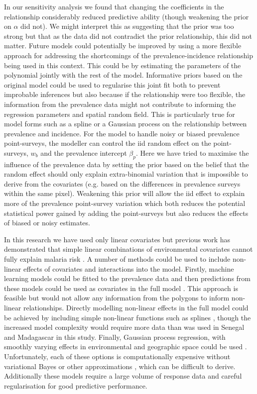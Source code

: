 \documentclass{statsoc}
\begin{document}
In our sensitivity analysis we found that changing the coefficients in the relationship considerably reduced predictive ability (though weakening the prior on $\alpha$ did not). 
We might interpret this as suggesting that the prior was too strong but that as the data did not contradict the prior relationship, this did not matter.
Future models could potentially be improved by using a more flexible approach for addressing the shortcomings of the prevalence-incidence relationship \citep{cameron2015defining} being used in this context.
This could be by estimating the parameters of the polynomial jointly with the rest of the model.
Informative priors based on the original model could be used to regularise this joint fit both to prevent improbable inferences but also because if the relationship were too flexible, the information from the prevalence data might not contribute to informing the regression parameters and spatial random field.
This is particularly true for model forms such as a spline or a Gaussian process on the relationship between prevalence and incidence.
For the model to handle noisy or biased prevalence point-surveys, the modeller can control the iid random effect on the point-surveys, $w_b$ and the prevalence intercept $\beta_p$. 
Here we have tried to maximise the influence of the prevalence data by setting the prior based on the belief that the random effect should only explain extra-binomial variation that is impossible to derive from the covariates (e.g. based on the differences in prevalence surveys within the same pixel).
Weakening this prior will allow the iid effect to explain more of the prevalence point-survey variation which both reduces the potential statistical power gained by adding the point-surveys but also reduces the effects of biased or noisy estimates.

In this research we have used only linear covariates but previous work has demonstrated that simple linear combinations of environmental covariates cannot fully explain malaria risk \citep{bhatt2017improved}.
A number of methods could be used to include non-linear effects of covariates and interactions into the model.
Firstly, machine learning models could be fitted to the prevalence data and then predictions from these models could be used as covariates in the full model \citep{bhatt2017improved}.
This approach is feasible but would not allow any information from the polygons to inform non-linear relationships.
Directly modelling non-linear effects in the full model could be achieved by including simple non-linear functions such as splines \citep{sissoko2017temporal, sewe2017using, hundessa2018projecting}, though the increased model complexity would require more data than was used in Senegal and Madagascar in this study.
Finally, Gaussian process regression, with smoothly varying effects in environmental and geographic space could be used \citep{law2018variational}.
Unfortunately, each of these options is computationally expensive without variational Bayes or other approximations \citep{law2018variational, ton2018spatial}, which can be difficult to derive.
Additionally these models require a large volume of response data and careful regularisation for good predictive performance.
\end{document}

